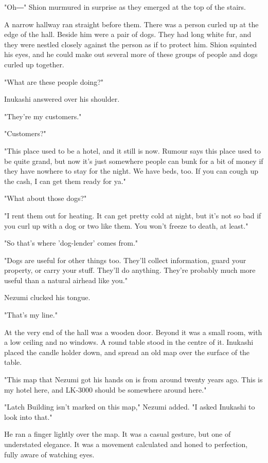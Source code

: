 "Oh―" Shion murmured in surprise as they emerged at the top of the
stairs.

A narrow hallway ran straight before them. There was a person curled up
at the edge of the hall. Beside him were a pair of dogs. They had long
white fur, and they were nestled closely against the person as if to
protect him. Shion squinted his eyes, and he could make out several more
of these groups of people and dogs curled up together.

"What are these people doing?"

Inukashi answered over his shoulder.

"They're my customers."

"Customers?"

"This place used to be a hotel, and it still is now. Rumour says this
place used to be quite grand, but now it's just somewhere people can
bunk for a bit of money if they have nowhere to stay for the night. We
have beds, too. If you can cough up the cash, I can get them ready for
ya."

"What about those dogs?"

"I rent them out for heating. It can get pretty cold at night, but it's
not so bad if you curl up with a dog or two like them. You won't freeze
to death, at least."

"So that's where 'dog-lender' comes from."

"Dogs are useful for other things too. They'll collect information,
guard your property, or carry your stuff. They'll do anything. They're
probably much more useful than a natural airhead like you."

Nezumi clucked his tongue.

"That's my line."

At the very end of the hall was a wooden door. Beyond it was a small
room, with a low ceiling and no windows. A round table stood in the
centre of it. Inukashi placed the candle holder down, and spread an old
map over the surface of the table.

"This map that Nezumi got his hands on is from around twenty years ago.
This is my hotel here, and LK-3000 should be somewhere around here."

"Latch Building isn't marked on this map," Nezumi added. "I asked
Inukashi to look into that."

He ran a finger lightly over the map. It was a casual gesture, but one
of understated elegance. It was a movement calculated and honed to
perfection, fully aware of watching eyes.

